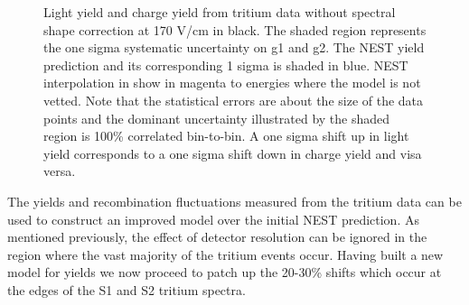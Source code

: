 \begin{figure}[h!]
\hfill
{}

\caption{Light yield and charge yield from tritium data without spectral shape correction at 170 V/cm in black. The shaded region represents the one sigma systematic uncertainty on g1 and g2. The NEST yield prediction and its corresponding 1 sigma is shaded in blue. NEST interpolation in show in magenta to energies where the model is not vetted. Note that the statistical errors are about the size of the data points and the dominant uncertainty illustrated by the shaded region is 100\% correlated bin-to-bin. A one sigma shift up in light yield corresponds to a one sigma shift down in charge yield and visa versa.}
\label{fig:LYQY_iter0}
\end{figure}
\renewcommand{\baselinestretch}{2}
\small\normalsize

The yields and recombination fluctuations measured from the tritium data can be used to construct an improved model over the initial NEST prediction. As mentioned previously, the effect of detector resolution can be ignored in the region where the vast majority of the tritium events occur. Having built a new model for yields we now proceed to patch up the 20-30\% shifts which occur at the edges of the S1 and S2 tritium spectra.




